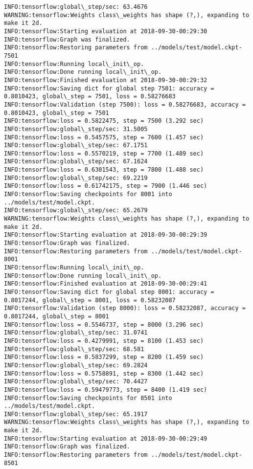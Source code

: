 \documentclass[11pt]{article}
\begin{document}
\begin{Verbatim}[commandchars=\\\{\}]
INFO:tensorflow:global\_step/sec: 63.4676
WARNING:tensorflow:Weights class\_weights has shape (?,), expanding to make it 2d.
INFO:tensorflow:Starting evaluation at 2018-09-30-00:29:30
INFO:tensorflow:Graph was finalized.
INFO:tensorflow:Restoring parameters from ../models/test/model.ckpt-7501
INFO:tensorflow:Running local\_init\_op.
INFO:tensorflow:Done running local\_init\_op.
INFO:tensorflow:Finished evaluation at 2018-09-30-00:29:32
INFO:tensorflow:Saving dict for global step 7501: accuracy = 0.8010423, global\_step = 7501, loss = 0.58276683
INFO:tensorflow:Validation (step 7500): loss = 0.58276683, accuracy = 0.8010423, global\_step = 7501
INFO:tensorflow:loss = 0.5822475, step = 7500 (3.292 sec)
INFO:tensorflow:global\_step/sec: 31.5005
INFO:tensorflow:loss = 0.5457575, step = 7600 (1.457 sec)
INFO:tensorflow:global\_step/sec: 67.1751
INFO:tensorflow:loss = 0.5570219, step = 7700 (1.489 sec)
INFO:tensorflow:global\_step/sec: 67.1624
INFO:tensorflow:loss = 0.6301543, step = 7800 (1.488 sec)
INFO:tensorflow:global\_step/sec: 69.2219
INFO:tensorflow:loss = 0.61742175, step = 7900 (1.446 sec)
INFO:tensorflow:Saving checkpoints for 8001 into ../models/test/model.ckpt.
INFO:tensorflow:global\_step/sec: 65.2679
WARNING:tensorflow:Weights class\_weights has shape (?,), expanding to make it 2d.
INFO:tensorflow:Starting evaluation at 2018-09-30-00:29:39
INFO:tensorflow:Graph was finalized.
INFO:tensorflow:Restoring parameters from ../models/test/model.ckpt-8001
INFO:tensorflow:Running local\_init\_op.
INFO:tensorflow:Done running local\_init\_op.
INFO:tensorflow:Finished evaluation at 2018-09-30-00:29:41
INFO:tensorflow:Saving dict for global step 8001: accuracy = 0.8017244, global\_step = 8001, loss = 0.58232087
INFO:tensorflow:Validation (step 8000): loss = 0.58232087, accuracy = 0.8017244, global\_step = 8001
INFO:tensorflow:loss = 0.5546737, step = 8000 (3.296 sec)
INFO:tensorflow:global\_step/sec: 31.0741
INFO:tensorflow:loss = 0.4279991, step = 8100 (1.453 sec)
INFO:tensorflow:global\_step/sec: 68.581
INFO:tensorflow:loss = 0.5837299, step = 8200 (1.459 sec)
INFO:tensorflow:global\_step/sec: 69.2824
INFO:tensorflow:loss = 0.5758891, step = 8300 (1.442 sec)
INFO:tensorflow:global\_step/sec: 70.4427
INFO:tensorflow:loss = 0.59479773, step = 8400 (1.419 sec)
INFO:tensorflow:Saving checkpoints for 8501 into ../models/test/model.ckpt.
INFO:tensorflow:global\_step/sec: 65.1917
WARNING:tensorflow:Weights class\_weights has shape (?,), expanding to make it 2d.
INFO:tensorflow:Starting evaluation at 2018-09-30-00:29:49
INFO:tensorflow:Graph was finalized.
INFO:tensorflow:Restoring parameters from ../models/test/model.ckpt-8501

\end{Verbatim}
\end{document}
